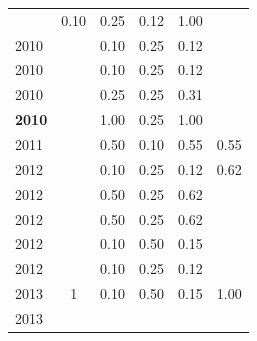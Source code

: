 \begin{table}[H]
\begin{tabular}{| l | c | c | c | c | c |}
          &
          0.10
          &
          0.25
          &
          0.12
          &
            {\color{blue} 1.00}
          \\
            2010
          &
          
          &
          0.10
          &
          0.25
          &
          0.12
          &
          \\
            2010
          &
          
          &
          0.10
          &
          0.25
          &
          0.12
          &
          \\
            2010
          &
          
          &
          0.25
          &
          0.25
          &
          0.31
          &
          \\
            {\bf 2010}
          &
          
          &
          1.00
          &
          0.25
          &
          1.00
          &
          \\
\hline
            2011
          &
          
          &
          0.50
          &
          0.10
          &
          0.55
          &
            {\color{blue} 0.55}
          \\
\hline
            2012
          &
          
          &
          0.10
          &
          0.25
          &
          0.12
          &
            {\color{blue} 0.62}
          \\
            2012
          &
          
          &
          0.50
          &
          0.25
          &
          0.62
          &
          \\
            2012
          &
          
          &
          0.50
          &
          0.25
          &
          0.62
          &
          \\
            2012
          &
          
          &
          0.10
          &
          0.50
          &
          0.15
          &
          \\
            2012
          &
          
          &
          0.10
          &
          0.25
          &
          0.12
          &
          \\
\hline
            2013
          &
          1
          &
          0.10
          &
          0.50
          &
          0.15
          &
            {\color{blue} 1.00}
          \\
            2013
          &
          

\end{tabular}
\end{table}
